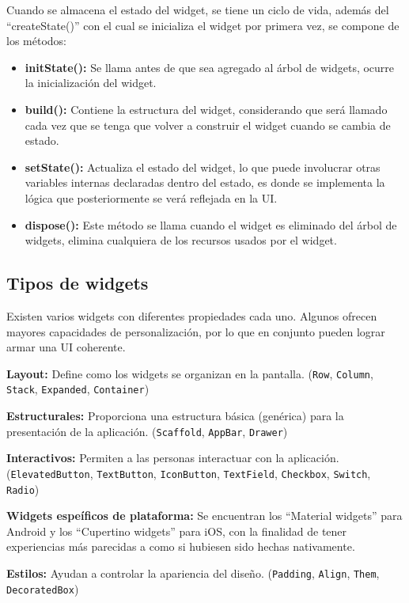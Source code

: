 Cuando se almacena el estado del widget, se tiene un ciclo de vida, además del “createState()” con el cual se inicializa el widget por primera vez, se compone de los métodos:

\begin{itemize}
  \item \textbf{initState():} Se llama antes de que sea agregado al árbol de widgets, ocurre la inicialización del widget.
  \item \textbf{build():} Contiene la estructura del widget, considerando que será llamado cada vez que se tenga que volver a construir el widget cuando se cambia de estado.
  \item \textbf{setState():} Actualiza el estado del widget, lo que puede involucrar otras variables internas declaradas dentro del estado, es donde se implementa la lógica que posteriormente se verá reflejada en la UI.
  \item \textbf{dispose():} Este método se llama cuando el widget es eliminado del árbol de widgets, elimina cualquiera de los recursos usados por el widget.
\end{itemize}

\subsection{Tipos de widgets}
Existen varios widgets con diferentes propiedades cada uno. Algunos ofrecen mayores capacidades de personalización, por lo que en conjunto pueden lograr armar una UI coherente. \parencite{Pandya2025}

\textbf{Layout:} Define como los widgets se organizan en la pantalla. (\lstinline{Row}, \lstinline{Column}, \lstinline{Stack}, \lstinline{Expanded}, \lstinline{Container})

\textbf{Estructurales:} Proporciona una estructura básica (genérica) para la presentación de la aplicación. (\lstinline{Scaffold}, \lstinline{AppBar}, \lstinline{Drawer})


\textbf{Interactivos:} Permiten a las personas interactuar con la aplicación. (\lstinline{ElevatedButton}, \lstinline{TextButton}, \lstinline{IconButton}, \lstinline{TextField}, \lstinline{Checkbox}, \lstinline{Switch}, \lstinline{Radio})


\textbf{Widgets espeíficos de plataforma:} Se encuentran los ``Material widgets'' para Android y los ``Cupertino widgets'' para iOS, con la finalidad de tener experiencias más parecidas a como si hubiesen sido hechas nativamente.


\textbf{Estilos:} Ayudan a controlar la apariencia del diseño. (\lstinline{Padding}, \lstinline{Align}, \lstinline{Them}, \lstinline{DecoratedBox})

